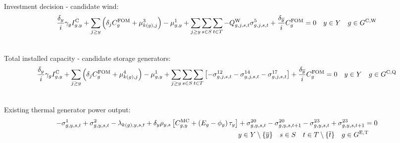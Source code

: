 \documentclass{article}
\begin{document}
Investment decision - candidate wind:
\begin{align}
& \frac{\cDiscountRate}{\cInterestRate} \cAmortisationRate \cCandidateInvestmentCost + \sum\limits_{\iYearAlias \geq \iYear} \left(\cDiscountRate[\iYearAlias] \cFixedOperationsMaintenanceCostGenerator + \dWindBuildLimit[k(\iGenerator), \iYearAlias] \right) - \dNonNegativeCandidateCapacity 
+ \sum\limits_{\iYearAlias \geq \iYear} \sum\limits_{\iScenario \in \sScenarios} \sum\limits_{\iInterval \in \sIntervals} - \cCapacityFactorWind[\iGenerator,\iYearAlias,\iScenario,\iInterval] \dMaxPowerOutputWindCandidate[\iGenerator,\iYearAlias,\iScenario,\iInterval] + \frac{\cDiscountRate[\iYearTerminal]}{\cInterestRate}\cFixedOperationsMaintenanceCostGenerator = 0 \quad  \iYear \in \sYears \quad  \iGenerator \in \sGeneratorsCandidateWind\\\nonumber
\end{align}

Total installed capacity - candidate storage generators:
\begin{align}
& \frac{\cDiscountRate}{\cInterestRate} \cAmortisationRate \cCandidateInvestmentCost + \sum\limits_{\iYearAlias \geq \iYear}\left(\cDiscountRate[\iYearAlias] \cFixedOperationsMaintenanceCostGenerator + \dStorageBuildLimit[k(\iGenerator),\iYearAlias] \right) - \dNonNegativeCandidateCapacity + \sum\limits_{\iYearAlias \geq \iYear} \sum\limits_{\iScenario \in \sScenarios} \sum\limits_{\iInterval \in \sIntervals} \left[- \dMaxChargingRateCandidate[\iGenerator,\iYearAlias,\iScenario,\iInterval] - \dMaxDischargingRateCandidate[\iGenerator,\iYearAlias,\iScenario,\iInterval] - \dMaxStorageEnergyCandidate[\iGenerator,\iYearAlias,\iScenario,\iInterval] \right] + \frac{\cDiscountRate[\iYearTerminal]}{\cInterestRate}\cFixedOperationsMaintenanceCostGenerator = 0 \quad \iYear \in \sYears \quad \iGenerator \in \sStorageCandidate\\\nonumber
\end{align}

Existing thermal generator power output:
\begin{align}
-\dMinPowerOutput + \dMaxPowerOutputExistingThermal 
- \dPowerBalance[k(\iGenerator),\iYear,\iScenario,\iInterval] + \cDiscountRate \cScenarioDuration \left[\cMarginalCost + \left(\cEmissionsIntensity - \vBaseline\right)\vPermitPrice \right] & +  \dRampRateUp - \dRampRateUp[\iGenerator,\iYear,\iScenario,\iInterval + 1] - \dRampRateDown + \dRampRateDown[\iGenerator,\iYear,\iScenario,\iInterval + 1] = 0 \nonumber\\
&  \iYear \in \sYears \setminus \{\iYearTerminal\} \quad  \iScenario \in \sScenarios \quad  \iInterval \in \sIntervals \setminus \{\iIntervalTerminal\} \quad  \iGenerator \in \sGeneratorsExistingThermal\\\nonumber
\end{align}
\end{document}
